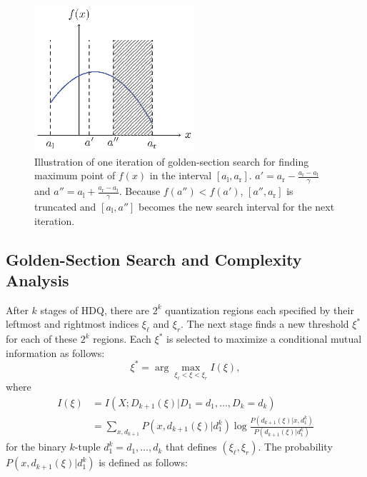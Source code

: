 \documentclass [PhD] {uclathes}
\begin{document}
\begin{figure}[t]
	\centering
	\includegraphics[width=14pc]{figures/gss.eps}
	\caption{ Illustration of one iteration of golden-section search for finding maximum point of $f(x)$ in the interval $[a_\text{l},a_\text{r}]$. $a'=a_{\text{r}}-\frac{a_\text{r}-a_\text{l}}{\gamma}$ and $a''=a_{\text{l}}+\frac{a_\text{r}-a_\text{l}}{\gamma}$. Because $f(a'')<f(a')$, $[a'',a_\text{r}]$ is truncated and $[a_\text{l},a'']$ becomes the new search interval for the next iteration. 
	}
	\label{fig: gss}
\end{figure}

\subsection{Golden-Section Search and Complexity Analysis}\label{Sec: GSS}
After $k$ stages of HDQ, there are $2^k$ quantization regions each specified by their leftmost and rightmost indices $\xi_{\ell}$ and $\xi_r$.  The next stage finds a new threshold $\xi^*$ for each of these $2^k$ regions.   Each $\xi^*$ is selected to maximize a conditional mutual information as follows:
    \begin{equation}
    \xi^* = \arg \max_{\xi_{\ell}<\xi<\xi_r}  I(\xi),
    \label{equ: optimzation}
    \end{equation}
where 
\begin{align}
      I(\xi) &= I\left(X;D_{k+1}(\xi)|D_1=d_1, \ldots,D_k=d_k \right)\label{equ: I_xi} \\
    &= \sum_{x,d_{k+1}} P\left(x,d_{k+1}(\xi)|d_1^k\right) \log  \frac{P(d_{k+1}(\xi)|x,d_1^k) }{P(d_{k+1}(\xi)|d_1^k) }
\end{align}
for the binary $k$-tuple $d_1^k=d_1, \ldots, d_k$  that defines $(\xi_{\ell}, \xi_r)$. The probability $P\left(x,d_{k+1}(\xi)|d_1^k\right)$ is defined as follows:
\end{document}
